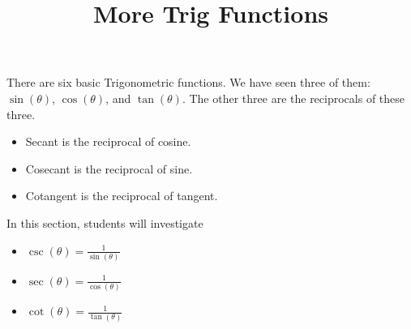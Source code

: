 \documentclass{ximera}
\title{More Trig Functions}
\begin{document}
\begin{abstract}
%
\end{abstract}
\maketitle







There are six basic Trigonometric functions.  We have seen three of them: $\sin(\theta)$, $\cos(\theta)$, and $\tan(\theta)$. The other three are the reciprocals of these three.


\begin{itemize}
\item Secant is the reciprocal of cosine.
\item Cosecant is the reciprocal of sine.
\item Cotangent is the reciprocal of tangent.
\end{itemize}







\begin{sectionOutcomes}
In this section, students will investigate

\begin{itemize}
\item $\csc(\theta) = \frac{1}{\sin(\theta)}$
\item $\sec(\theta) = \frac{1}{\cos(\theta)}$
\item $\cot(\theta) = \frac{1}{\tan(\theta)}$
\end{itemize}
\end{sectionOutcomes}
\end{document}
